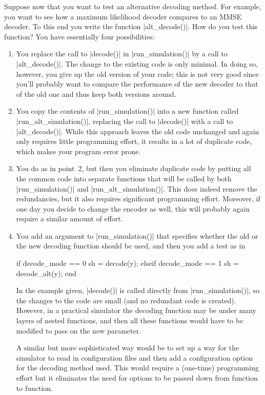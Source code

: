 Suppose now that you want to test an alternative decoding method. For example,
you want to see how a maximum likelihood decoder compares to an MMSE decoder. To
this end you write the function |alt_decode()|. How do you test this function?
You have essentially four possibilities:
\begin{enumerate}
  \item You replace the call to |decode()| in |run_simulation()| by a call to
    |alt_decode()|. The change to the existing code is only minimal. In doing
    so, however, you give up the old version of your code; this is not very
    good since you'll probably want to compare the performance of the new
    decoder to that of the old one and thus keep both versions around.

  \item You copy the contents of |run_simulation()| into a new function called
    |run_alt_simulation()|, replacing the call to |decode()| with a call to
    |alt_decode()|. While
    this approach leaves the old code unchanged and again only requires little 
    programming effort, it results in a lot of duplicate code, which makes your
    program error prone.

  \item You do as in point~2, but then you eliminate duplicate code by putting
    all the common code into separate functions that will be called by both
    |run_simulation()| and |run_alt_simulation()|. This does indeed remove the
    redundancies, but it also requires significant programming effort. Moreover,
    if one day you decide to change the encoder as well, this will probably
    again require a similar amount of effort. 

  \item You add an argument to |run_simulation()| that specifies whether the old
    or the new decoding function should be used, and then you add a test as in
\begin{Code}
  if decode_mode == 0
    sh = decode(y);
  elseif decode_mode == 1
    sh = decode_alt(y);
  end
\end{Code}
    In the example given, |decode()| is called directly from |run_simulation()|,
    so the changes to the code are small (and no redundant code is created).
    However, in a practical simulator the decoding function may be under many
    layers of nested functions, and then all these functions would have to be
    modified to pass on the new parameter. 

    A similar but more sophisticated way would be to set up a way for the
    simulator to read in configuration files and then add a configuration option
    for the decoding method used. This would require a (one-time) programming
    effort but it eliminates the need for options to be passed down from
    function to function. 


\end{enumerate}
